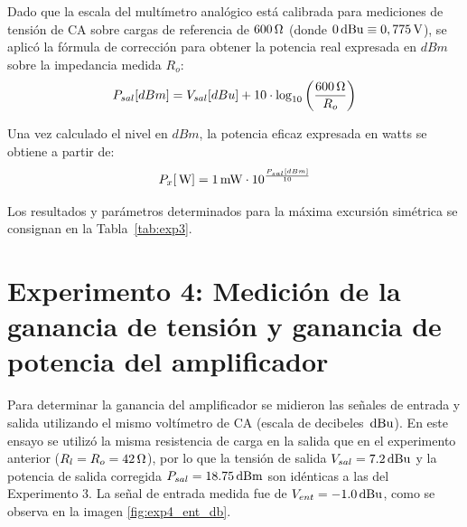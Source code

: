 Dado que la escala del multímetro analógico está calibrada para mediciones de tensión de CA sobre cargas de referencia
de $600\ohm$ (donde $0\dBu \equiv 0,775\V$), se aplicó la fórmula de corrección para obtener la potencia real
expresada en $dBm$ sobre la impedancia medida $R_o$:
\begin{equation}
    P_{sal} [dBm] = V_{sal} [dBu] + 10 \cdot \log_{10} \left( \frac{600\ohm}{R_o} \right)
\end{equation}

Una vez calculado el nivel en $dBm$, la potencia eficaz expresada en watts se obtiene a partir de:
\begin{equation}
    P_{x} [\W] = 1\mW \cdot 10^{\frac{P_{sal} [dBm]}{10}}
\end{equation}

Los resultados y parámetros determinados para la máxima excursión simétrica se consignan en la Tabla~\ref{tab:exp3}.

\begin{table}[!ht]
    \centering
    \caption{Determinación de la potencia de salida en carga adaptada utilizando escala en dB.}
    \label{tab:exp3}
\end{table}

\section{Experimento 4: Medición de la ganancia de tensión y ganancia de
potencia del amplificador} Para determinar la ganancia del amplificador se
midieron las señales de entrada y salida utilizando el mismo voltímetro de CA
(escala de decibeles $\dBu$). En este ensayo se utilizó la misma resistencia de
carga en la salida que en el experimento anterior ($R_l = R_o = 42\ohm$), por lo
que la tensión de salida $V_{sal} = 7.2\dBu$ y la potencia de salida corregida
$P_{sal} = 18.75\dBm$ son idénticas a las del Experimento 3. La señal de entrada
medida fue de $V_{ent} = -1.0\dBu$, como se observa en la imagen
\ref{fig:exp4_ent_db}.

